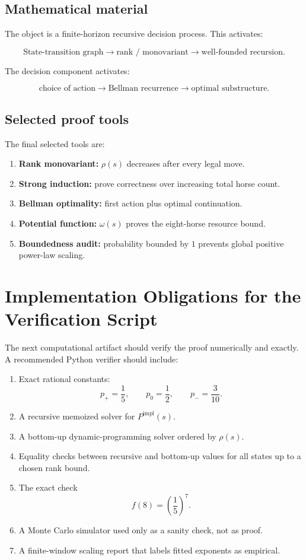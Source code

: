 \documentclass[11pt]{article}
\newcommand{\rank}{\rho}
\newcommand{\weight}{\omega}
\newcommand{\impl}{\mathrm{impl}}
\begin{document}
\subsection{Mathematical material}

The object is a finite-horizon recursive decision process.  This activates:

\[
    \text{State-transition graph}
    \longrightarrow
    \text{rank / monovariant}
    \longrightarrow
    \text{well-founded recursion}.
\]

The decision component activates:

\[
    \text{choice of action}
    \longrightarrow
    \text{Bellman recurrence}
    \longrightarrow
    \text{optimal substructure}.
\]

\subsection{Selected proof tools}

The final selected tools are:

\begin{enumerate}
    \item \textbf{Rank monovariant:} \(\rank(s)\) decreases after every legal move.
    \item \textbf{Strong induction:} prove correctness over increasing total horse count.
    \item \textbf{Bellman optimality:} first action plus optimal continuation.
    \item \textbf{Potential function:} \(\weight(s)\) proves the eight-horse resource bound.
    \item \textbf{Boundedness audit:} probability bounded by \(1\) prevents global positive power-law scaling.
\end{enumerate}

\section{Implementation Obligations for the Verification Script}

The next computational artifact should verify the proof numerically and exactly.  A recommended Python verifier should include:

\begin{enumerate}
    \item Exact rational constants:
    \[
        p_+=\frac15,\qquad p_0=\frac12,\qquad p_-=\frac3{10}.
    \]
    \item A recursive memoized solver for \(P^\impl(s)\).
    \item A bottom-up dynamic-programming solver ordered by \(\rank(s)\).
    \item Equality checks between recursive and bottom-up values for all states up to a chosen rank bound.
    \item The exact check
    \[
        f(8)=\left(\frac15\right)^7.
    \]
    \item A Monte Carlo simulator used only as a sanity check, not as proof.
    \item A finite-window scaling report that labels fitted exponents as empirical.
\end{enumerate}
\end{document}
